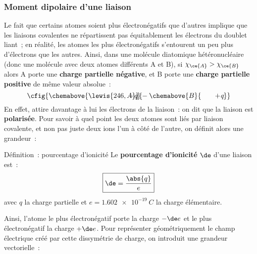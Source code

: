 \documentclass[../main/main.tex]{subfiles}
\begin{document}
\subsubsection{Moment dipolaire d'une liaison}

Le fait que certains atomes soient plus électronégatifs que d'autres implique
que les liaisons covalentes ne répartissent pas équitablement les électrons du
doublet liant~; en réalité, les atomes les plus électronégatifs s'entourent un
peu plus d'électrons que les autres. Ainsi, dans une molécule diatomique
hétéronucléaire (donc une molécule avec deux atomes différents A et B), si
$\chi_{\ce{A}} > \chi_{\ce{B}}$ alors A porte une \textbf{charge partielle
négative}, et B porte une \textbf{charge partielle positive} de même valeur
absolue~:
\[
    \cfig{
        \chemabove{\lewis{246,A}}{\hspace{-20pt}-\emph{q}}-
        \chemabove{B}{\hspace{20pt}+\emph{q}}
    }
\]
En effet,  attire davantage à lui les électrons de la liaison~: on dit que
la liaison est \textbf{polarisée}. Pour savoir à quel point les deux atomes sont
liés par liaison covalente, et non pas juste deux ions l'un à côté de l'autre,
on définit alors une grandeur~:

\begin{tdefi}{Définition~: pourcentage d'ionicité}
    Le \textbf{pourcentage d'ionicité} $\de$ d'une liaison est~:
    \[\boxed{\de = \frac{\abs{q}}{e}}\]
    avec $q$ la charge partielle et $e = \SI{1.602e-19}{C}$ la charge
    élémentaire.
\end{tdefi}

Ainsi, l'atome le plus électronégatif porte la charge $-\de e$ et le plus
électronégatif la charge $+\de e$. Pour représenter géométriquement le champ
électrique créé par cette dissymétrie de charge, on introduit une grandeur
vectorielle~:
\end{document}
